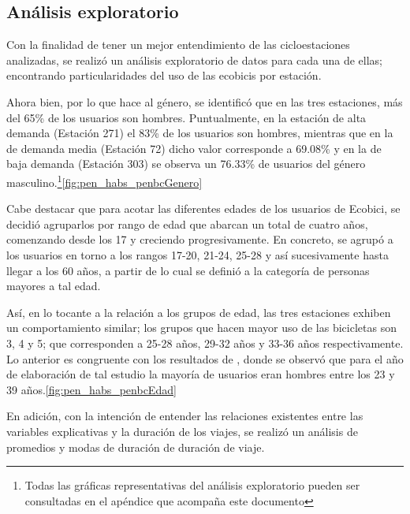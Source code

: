 \documentclass[9pt,twocolumn,twoside]{ilcss}
\begin{document}
\subsection{Análisis exploratorio}

Con la finalidad de tener un mejor entendimiento de las cicloestaciones analizadas, se realizó un análisis exploratorio de datos para cada una de ellas; encontrando particularidades del uso de las ecobicis por estación.

Ahora bien, por lo que hace al género, se identificó que en las tres estaciones, más del 65\% de los usuarios son hombres. Puntualmente, en la estación de alta demanda (Estación 271) el 83\% de los usuarios son hombres, mientras que en la de demanda media (Estación 72) dicho valor corresponde a 69.08\% y en la de baja demanda (Estación 303) se observa un 76.33\% de usuarios del género masculino.\footnote{Todas las gráficas representativas del análisis exploratorio pueden ser consultadas en el apéndice que acompaña este documento }\ref{fig:pen_habs_penbcGenero}

Cabe destacar que para acotar las diferentes edades de los usuarios de Ecobici, se decidió agruparlos por rango de edad que abarcan un total de cuatro años, comenzando desde los 17 y creciendo progresivamente. En concreto, se agrupó a los usuarios en torno a los rangos 17-20, 21-24, 25-28 y así sucesivamente hasta llegar a los 60 años, a partir de lo cual se definió a la categoría de personas mayores a tal edad.

Así, en lo tocante a la relación a los grupos de edad, las tres estaciones exhiben un comportamiento similar; los grupos que hacen mayor uso de las bicicletas son 3, 4 y 5; que corresponden a 25-28 años, 29-32 años y 33-36 años respectivamente. Lo anterior es congruente con los resultados de \cite{Ecobicis2017}, donde se observó que para el año de elaboración de tal estudio la mayoría de usuarios eran hombres entre los 23 y 39 años.\ref{fig:pen_habs_penbcEdad}

En adición, con la intención de entender las relaciones existentes entre las variables explicativas y la duración de los viajes, se realizó un análisis de promedios y modas de duración de duración de viaje. 
\end{document}
